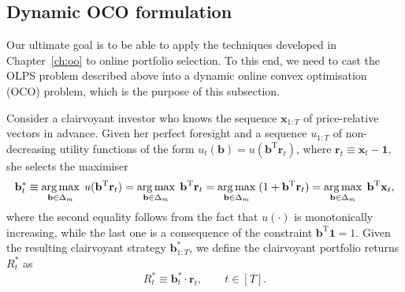 \subsection{Dynamic OCO formulation}
\label{sec:olps-as-dynamic-oco}

Our ultimate goal is to be able to apply the techniques developed in Chapter~\ref{ch:oo} to online portfolio selection. To this end, we need to cast the OLPS problem described above into a dynamic online convex optimisation (OCO) problem, which is the purpose of this subsection.

Consider a clairvoyant investor who knows the sequence $\mathbf{x}_{1:T}$ of price-relative vectors in advance. Given her perfect foresight and a sequence $u_{1:T}$ of non-decreasing utility functions of the form $u_t(\mathbf{b}) = u(\mathbf{b}^\text{T}\mathbf{r}_t)$, where $\mathbf{r}_t \equiv \mathbf{x}_t - \mathbf{1}$, she selects the maximiser
\begin{equation}
\label{eq:cv-portfolio}
	\mathbf{b}_t^*
	\equiv \operatorname*{arg\,max}_{\mathbf{b} \in \Delta_m} \; u(\mathbf{b}^\text{T}\mathbf{r}_t)
	= \operatorname*{arg\,max}_{\mathbf{b} \in \Delta_m} \; \mathbf{b}^\text{T}\mathbf{r}_t
	= \operatorname*{arg\,max}_{\mathbf{b} \in \Delta_m} \; (1 + \mathbf{b}^\text{T}\mathbf{r}_t)
	= \operatorname*{arg\,max}_{\mathbf{b} \in \Delta_m} \; \mathbf{b}^\text{T}\mathbf{x}_t,
\end{equation}
where the second equality follows from the fact that $u(\cdot)$ is monotonically increasing, while the last one is a consequence of the constraint $\mathbf{b}^\text{T}\mathbf{1} = 1$. Given the resulting clairvoyant strategy $\mathbf{b}_{1:T}^*$, we define the clairvoyant portfolio returns $R_t^*$ as
\begin{equation}
\label{eq:cv-portfolio-return}
	R_t^* \equiv \mathbf{b}_t^* \cdot \mathbf{r}_t,
	\qquad t \in [T].
\end{equation}

